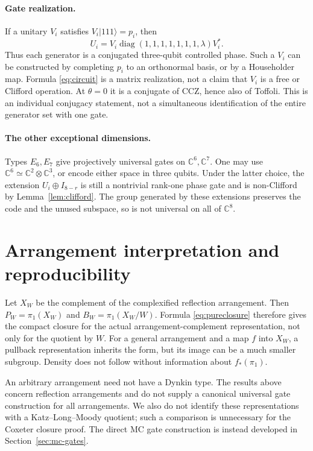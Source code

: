 \documentclass[11pt,a4paper]{article}
\theoremstyle{remark}\newtheorem{remark}[theorem]{Remark}
\newcommand{\C}{\mathbb C}
\newcommand{\diag}{\operatorname{diag}}
\begin{document}
\paragraph{Gate realization.}
If a unitary $V_i$ satisfies $V_i|111\rangle=p_i$, then
\begin{equation}\label{eq:circuit}
 U_i=V_i\diag(1,1,1,1,1,1,1,\lambda)V_i^*.
\end{equation}
Thus each generator is a conjugated three-qubit controlled phase.
Such a $V_i$ can be constructed by completing $p_i$ to an orthonormal
basis, or by a Householder map.  Formula \eqref{eq:circuit} is a matrix
realization, not a claim that $V_i$ is a free or Clifford operation.
At $\theta=0$ it is a conjugate of CCZ, hence also of Toffoli.
This is an individual conjugacy statement, not a simultaneous
identification of the entire generator set with one gate.

\paragraph{The other exceptional dimensions.}
Types $E_6,E_7$ give projectively universal gates on $\C^6,\C^7$.
One may use $\C^6\simeq\C^2\otimes\C^3$, or encode either space in
three qubits.  Under the latter choice, the extension
$U_i\oplus I_{8-r}$ is still a nontrivial rank-one phase gate and is
non-Clifford by Lemma~\ref{lem:clifford}.  The group generated by these extensions preserves
the code and the unused subspace, so is not universal on all of $\C^8$.

\section{Arrangement interpretation and reproducibility}
Let $X_W$ be the complement of the complexified reflection arrangement.
Then $P_W=\pi_1(X_W)$ and $B_W=\pi_1(X_W/W)$.  Formula
\eqref{eq:pureclosure} therefore gives the compact closure for the
actual arrangement-complement representation, not only for the quotient
by $W$.  For a general arrangement and a map $f$ into $X_W$,
a pullback representation inherits the form, but its image can
be a much smaller subgroup.  Density does not follow without information
about $f_*(\pi_1)$.

An arbitrary arrangement need not have a Dynkin type.  The results above
concern reflection arrangements and do not supply a canonical universal
gate construction for all arrangements.  We also do not identify these
representations with a Katz--Long--Moody quotient; such a comparison is
unnecessary for the Coxeter closure proof. The direct MC gate
construction is instead developed in Section~\ref{sec:mc-gates}.
\end{document}
